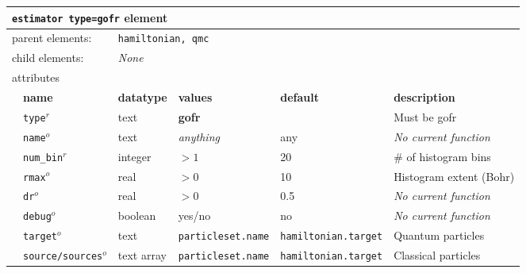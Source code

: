 \FloatBarrier
\begin{table}[h]
\begin{center}
\begin{tabularx}{\textwidth}{l l l l l l }
\hline
\multicolumn{6}{l}{\texttt{estimator type=gofr} element} \\
\hline
\multicolumn{2}{l}{parent elements:} & \multicolumn{4}{l}{\texttt{hamiltonian, qmc}}\\
\multicolumn{2}{l}{child  elements:} & \multicolumn{4}{l}{\textit{None}}\\
\multicolumn{2}{l}{attributes}  & \multicolumn{4}{l}{}\\
   & \bfseries name       & \bfseries datatype & \bfseries values  & \bfseries default   & \bfseries description \\
   & \texttt{type}$^r$    &  text              & \textbf{gofr}     &                     & Must be gofr       \\
   & \texttt{name}$^o$    &  text              & \textit{anything} & any                 & \textit{No current function} \\
   & \texttt{num\_bin}$^r$&  integer           & $>1$              & 20                  & \# of histogram bins \\
   & \texttt{rmax}$^o$    &  real              & $>0$              & 10                  & Histogram extent (Bohr) \\
   & \texttt{dr}$^o$      &  real              & $>0$              & 0.5                 & \textit{No current function} \\%
   & \texttt{debug}$^o$   &  boolean           & yes/no            & no                  & \textit{No current function} \\
   & \texttt{target}$^o$  &  text              &\texttt{particleset.name}&\texttt{hamiltonian.target}& Quantum particles \\   
   & \texttt{source/sources}$^o$&  text array  &\texttt{particleset.name}&\texttt{hamiltonian.target}& Classical particles\\
  \hline
\end{tabularx}
\end{center}
\end{table}
\FloatBarrier

